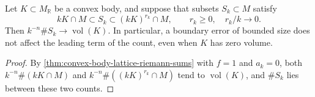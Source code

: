 \begin{corollary}\label{cor:bounded-boundary-error-lattice-count}
Let $K\subset M_{\mathbb R}$ be a convex body, and suppose that subsets $S_k\subset M$ satisfy
\[
 kK\cap M\subset S_k\subset(kK)^{r_k}\cap M,
                         \qquad r_k\geq0,\quad r_k/k\to0.
\]
Then $k^{-n}\#S_k\to\operatorname{vol}(K)$. In particular, a boundary error of bounded size does not affect the leading term of the count, even when $K$ has zero volume.
\end{corollary}
\begin{proof}
By \cref{thm:convex-body-lattice-riemann-sums} with $f=1$ and $a_k=0$, both $k^{-n}\#(kK\cap M)$ and $k^{-n}\#((kK)^{r_k}\cap M)$ tend to $\operatorname{vol}(K)$, and $\#S_k$ lies between these two counts.
\end{proof}


